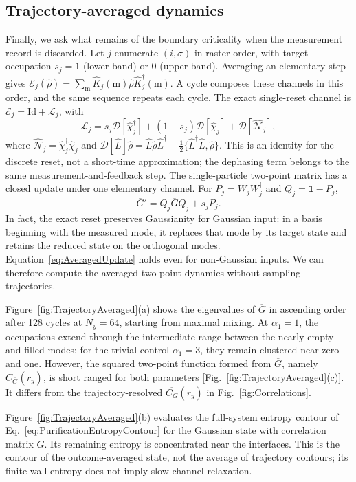 \documentclass[aps,prb,10pt,twocolumn,superscriptaddress,longbibliography,floatfix]{revtex4-2}
\newcommand{\mc}[1]{\mathcal{#1}}
\newcommand{\Id}{\mathbf{1}}
\newcommand{\newtext}[1]{{\color{blue}#1}}
\newcommand{\claudeadd}[1]{{\color{orange}#1}}
\begin{document}
{\color{blue}
\subsection{Trajectory-averaged dynamics}
\label{sec:TrajectoryAveraged}

Finally, we ask what remains of the boundary criticality when the measurement record is discarded. Let $j$ enumerate $(i,\sigma)$ in raster order, with target occupation $s_j=1$ (lower band) or $0$ (upper band). Averaging an elementary step gives $\mc E_j(\hat\rho)=\sum_{\mathrm m}\hat K_j(\mathrm m)\hat\rho\hat K_j^\dagger(\mathrm m)$. A cycle composes these channels in this order, and the same sequence repeats each cycle. The exact single-reset channel is $\mc E_j=\mathrm{Id}+\mc L_j$, with
\begin{equation}
 \mc L_j=s_j\mc D[\hat\chi_j^\dagger]+(1-s_j)\mc D[\hat\chi_j]+\mc D[\hat{\mc N}_j],
 \label{eq:AveragedChannel}
\end{equation}
where $\hat{\mc N}_j=\hat\chi_j^\dagger\hat\chi_j$ and $\mc D[\hat L]\hat\rho=\hat L\hat\rho\hat L^\dagger-\tfrac12\{\hat L^\dagger\hat L,\hat\rho\}$. This is an identity for the discrete reset, not a short-time approximation; the dephasing term belongs to the same measurement-and-feedback step. The single-particle two-point matrix has a closed update under one elementary channel. For \claudeadd{$P_j=W_jW_j^\dagger$} and $Q_j=\Id-P_j$,
\begin{equation}
 \overline G'=Q_j\overline GQ_j+s_jP_j.
 \label{eq:AveragedUpdate}
\end{equation}
In fact, the exact reset preserves Gaussianity for Gaussian input: in a basis beginning with the measured mode, it replaces that mode by its target state and retains the reduced state on the orthogonal modes. Equation~\eqref{eq:AveragedUpdate} holds even for non-Gaussian inputs. We can therefore compute the averaged two-point dynamics without sampling trajectories.

Figure~\ref{fig:TrajectoryAveraged}(a) shows the eigenvalues of $\overline G$ in ascending order after 128 cycles at $N_y=64$, starting from maximal mixing. At $\alpha_1=1$, the occupations extend through the intermediate range between the nearly empty and filled modes; for the trivial control $\alpha_1=3$, they remain clustered near zero and one. However, the squared two-point function formed from $\overline G$, namely $C_{\overline G}(r_y)$, is short ranged for both parameters [Fig.~\ref{fig:TrajectoryAveraged}(c)]. It differs from the trajectory-resolved $\overline{C_G}(r_y)$ in Fig.~\ref{fig:Correlations}.

\newtext{Figure~\ref{fig:TrajectoryAveraged}(b) evaluates the full-system entropy contour of Eq.~\eqref{eq:PurificationEntropyContour} for the Gaussian state with correlation matrix $\overline G$. Its remaining entropy is concentrated near the interfaces. This is the contour of the outcome-averaged state, not the average of trajectory contours; its finite wall entropy does not imply slow channel relaxation.}

}
\end{document}
